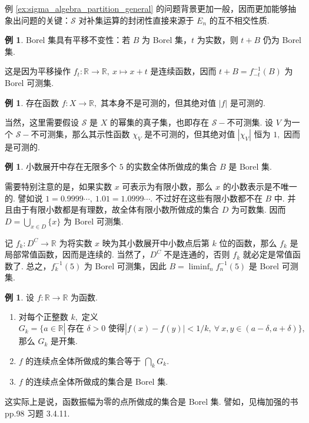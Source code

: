 \documentclass[12pt, a4paper, oneside]{book}
\numberwithin{figure}{section}
\theoremstyle{definition}
\newtheorem{example}[theorem]{例}
\begin{document}
例 \ref{ex:sigma_algebra_partition_general} 的问题背景更加一般，因而更加能够抽象出问题的关键：$\mathcal S$ 对补集运算的封闭性直接来源于 $E_n$ 的互不相交性质.



\begin{example}
    Borel 集具有平移不变性：若 $B$ 为 Borel 集，$t$ 为实数，则 $t+B$ 仍为 Borel 集.
\end{example}
这是因为平移操作 $f_t:\mathbb R\to\mathbb R,\ x\mapsto x+t$ 是连续函数，因而 $t+B= f_{-t}^{-1}(B)$ 为 Borel 可测集. 

\begin{example}
    存在函数 $f:X\to\mathbb R,$ 其本身不是可测的，但其绝对值 $|f|$ 是可测的.
\end{example}
当然，这里需要假设 $\mathcal S$ 是 $X$ 的幂集的真子集，也即存在 $\mathcal S-$不可测集. 设 $V$ 为一个 $\mathcal S-$不可测集，那么其示性函数 $\chi_V$ 是不可测的，但其绝对值 $|\chi_V|$ 恒为 $1,$ 因而是可测的.

\begin{example}
    小数展开中存在无限多个 $5$ 的实数全体所做成的集合 $B$ 是 Borel 集.
\end{example}
需要特别注意的是，如果实数 $x$ 可表示为有限小数，那么 $x$ 的小数表示是不唯一的. 譬如说 $1=0.9999\cdots,\ 1.01=1.0999\cdots.$ 
不过好在这些有限小数都不在 $B$ 中. 并且由于有限小数都是有理数，故全体有限小数所做成的集合 $D$ 为可数集. 因而 $D=\bigcup_{x\in D}\{x\}$ 为 Borel 可测集.

记 $f_k:D^C\to \mathbb R$ 为将实数 $x$ 映为其小数展开中小数点后第 $k$ 位的函数，那么 $f_k$ 是局部常值函数，因而是连续的. 当然了，$D^C$ 不是连通的，否则 $f_k$ 就必定是常值函数了.
总之，$f_k^{-1}(5)$ 为 Borel 可测集，因此 $B=\liminf_n f_n^{-1}(5)$ 是 Borel 可测集. 

\begin{example}\label{ex:continuous_point_set_is_Borel_measurable}
    设 $f:\mathbb R\to\mathbb R$ 为函数.
    \begin{enumerate}[label=\alph*)]
        \item 对每个正整数 $k,$ 定义 $G_k=\{a\in\mathbb R|\ \text{存在 $\delta>0$ 使得} |f(x)-f(y)|<1/k,\ \forall\ x,y\in (a-\delta,a+\delta) \},$ 那么 $G_k$ 是开集.
        \item $f$ 的连续点全体所做成的集合等于 $\bigcap_k G_k.$ 
        \item $f$ 的连续点全体所做成的集合是 Borel 集.
    \end{enumerate}
\end{example}
这实际上是说，函数振幅为零的点所做成的集合是 Borel 集. 譬如，见梅加强的书 \cite{Mei_2011} pp.98 习题 3.4.11.
\end{document}
